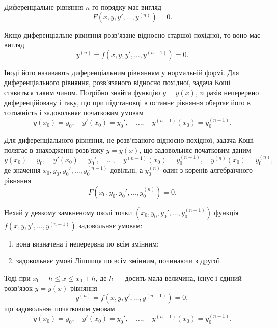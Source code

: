 Диференціальне рівняння $n$-го порядку має вигляд
\begin{equation*}
	F \left( x, y, y', \ldots, y^{(n)} \right) = 0.
\end{equation*}

Якщо диференціальне рівняння розв'язане відносно старшої похідної, то воно має вигляд
\begin{equation*}
	y^{(n)} = f \left( x, y, y', \ldots, y^{(n-1)} \right) = 0.
\end{equation*}

Іноді його називають диференціальним рівнянням у нормальній формі. Для диференціального рівняння, розв'язаного відносно похідної, задача Коші ставиться таким чином. Потрібно знайти функцію $y = y(x)$, $n$ разів неперервно диференційовану і таку, що при підстановці в останнє рівняння обертає його в тотожність і задовольняє початковим умовам 
\begin{equation*}
	y(x_0) = y_0, \quad y'(x_0) = y_0', \quad \ldots, \quad y^{(n - 1)} (x_0) = y_0^{(n-1)}.
\end{equation*}

Для диференціального рівняння, не розв'язаного відносно похідної, задача Коші полягає в знаходженні розв'язку $y = y(x)$, що задовольняє початковим даним 
\begin{equation*}
	y(x_0) = y_0, \quad y'(x_0) = y_0', \quad \ldots, \quad y^{(n - 1)} (x_0) = y_0^{(n-1)}, \quad y^{(n)} (x_0) = y_0^{(n)},
\end{equation*}
де значення $x_0, y_0, y_0', \ldots, y_0^{(n-1)}$ довільні, а $y_0^{(n)}$ один з коренів алгебраїчного рівняння 
\begin{equation*}
	F \left( x_0, y_0, y_0', \ldots, y_0^{(n)} \right) = 0.
\end{equation*}

\begin{theorem}
	Нехай у деякому замкненому околі точки $\left(x_0, y_0, y_0', \ldots, y_0^{(n-1)}\right)$ функція $f\left(x,y,y',\ldots,y^{(n-1)}\right)$ задовольняє умовам:
	\begin{enumerate}
		\item вона визначена і неперервна по всім змінним;
		\item задовольняє умові Ліпшиця по всім змінним, починаючи з другої.
	\end{enumerate}
	
	Тоді при $x_0 - h \le x \le x_0 + h$, де $h$ --- досить мала величина, існує і єдиний розв'язок $y=y(x)$ рівняння
		\begin{equation*}
		y^{(n)} = f \left( x, y, y', \ldots, y^{(n-1)} \right) = 0,
	\end{equation*}
	що задовольняє початковим умовам 
	\begin{equation*}
		y(x_0) = y_0, \quad y'(x_0) = y_0', \quad \ldots, \quad y^{(n - 1)} (x_0) = y_0^{(n-1)}.
	\end{equation*}
\end{theorem}


